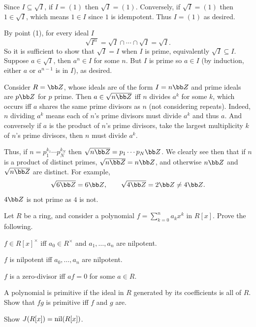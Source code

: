     \item Since $I\subseteq\sqrt I$, if $I=(1)$ then $\sqrt I=(1)$.
    Conversely, if $\sqrt I=(1)$ then $1\in\sqrt I$, which means $1\in I$ since $1$ is idempotent.
    Thus $I=(1)$ as desired.

    \item By point (1), for every ideal $I$
    $$ \sqrt{I^n} = \sqrt I\cap\cdots\cap\sqrt I = \sqrt I . $$
    So it is sufficient to show that $\sqrt I=I$ when $I$ is prime, equivalently $\sqrt I\subseteq I$.
    Suppose $a\in\sqrt I$, then $a^n\in I$ for some $n$.
    But $I$ is prime so $a\in I$ (by induction, either $a$ or $a^{n-1}$ is in $I$), as desired.

    \item Consider $R=\bZ$, whose ideals are of the form $I=n\bZ$ and prime ideals are $p\bZ$ for $p$ prime.
    Then $a\in\sqrt{n\bZ}$ iff $n$ divides $a^k$ for some $k$, which occurs iff $a$ shares the same prime divisors as $n$ (not considering repeats).
    Indeed, $n$ dividing $a^k$ means each of $n$'s prime divisors must divide $a^k$ and thus $a$.
    And conversely if $a$ is the product of $n$'s prime divisors, take the largest multiplicity $k$ of $n$'s prime divisors, then $n$ must divide $a^k$.

    Thus, if $n=p_1^{k_1}\cdots p_N^{k_N}$ then $\sqrt{n\bZ}=p_1\cdots p_N\bZ$.
    We clearly see then that if $n$ is a product of distinct primes, $\sqrt{n\bZ}=n\bZ$, and otherwise $n\bZ$ and $\sqrt{n\bZ}$ are distinct.
    For example,
    $$ \sqrt{6\bZ} = 6\bZ,\qquad \sqrt{4\bZ} = 2\bZ \neq 4\bZ . $$
    $4\bZ$ is not prime as $4$ is not.
\eenum

\bprob

    Let $R$ be a ring, and consider a polynomial $f=\sum_{k=0}^na_kx^k$ in $R[x]$.
    Prove the following.
    \benum
        \item $f\in R[x]^\times$ iff $a_0\in R^\times$ and $a_1,\dots,a_n$ are nilpotent.
        \item $f$ is nilpotent iff $a_0,\dots,a_n$ are nilpotent.
        \item $f$ is a zero-divisor iff $af=0$ for some $a\in R$.
        \item A polynomial is {\emphcolor primitive} if the ideal in $R$ generated by its coefficients is all of $R$.
        Show that $fg$ is primitive iff $f$ and $g$ are.
        \item Show $J(R[x])={\rm nil}(R[x])$.
    \eenum

\eprob


